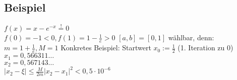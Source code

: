 \newpage

\subsection*{Beispiel}
$f(x)=x-e^{-x} \overset{!}{=} 0$\\
$f(0)=-1<0, f(1)=1-\frac{1}{e} > 0$\nl
$[a,b]=[0,1]$ wählbar, denn:
$m = 1+\frac{1}{e}, M=1$\nl
Konkretes Beispiel: Startwert $x_0 := \frac{1}{2}$ (1. Iteration zu $0$)\\
$x_1 = 0,566311\ldots$\\
$x_2 = 0,567143\ldots$\\
$|x_2-\xi| \le \frac{M}{2m} |x_2-x_1|^2 < 0,5 \cdot 10^{-6}$